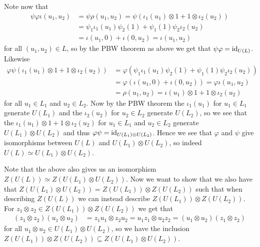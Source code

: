 Note now that
\begin{align*}
  \psi\varphi\iota(u_1,u_2) &= \psi\rho(u_1,u_2) = \psi(\iota_1(u_1)\otimes 1 + 1\otimes \iota_2(u_2)) \\
                              &= \psi_1\iota_1(u_1)\psi_2(1) + \psi_1(1)\psi_2\iota_2(u_2) \\
                            &= \iota(u_1,0) + \iota(0,u_2) = \iota(u_1,u_2)
\end{align*}
for all $(u_1,u_2)\in L$, so by the PBW theorem as above we get that $\psi\varphi=\operatorname{id}_{U(L)}$. Likewise
\begin{align*}
  \varphi\psi(\iota_1(u_1)\otimes 1 + 1\otimes \iota_2(u_2)) &= \varphi(\psi_1\iota_1(u_1)\psi_2(1) + \psi_1(1)\psi_2\iota_2(u_2)) \\
                                                             &= \varphi(\iota(u_1,0)+ \iota(0,u_2)) = \varphi\iota(u_1,u_2)\\
                                                             &= \rho(u_1,u_2) = \iota(u_1)\otimes 1 + 1\otimes \iota_2(u_2)
\end{align*}
for all $u_1\in L_1$ and $u_2\in L_2$. Now by the PBW theorem the $\iota_1(u_1)$ for $u_1\in L_1$ generate $U(L_1)$ and the $\iota_2(u_2)$ for $u_2\in L_2$ generate $U(L_2)$, so we see that the $\iota_1(u_1)\otimes 1+1\otimes\iota_2(u_2)$ for $u_1\in L_1$ and $u_2\in L_2$ generate $U(L_1)\otimes U(L_2)$ and thus $\varphi\psi=\operatorname{id}_{U(L_1)\otimes U(L_2)}$. Hence we see that $\varphi$ and $\psi$ give isomorphisms between $U(L)$ and $U(L_1)\otimes U(L_2)$, so indeed $U(L)\simeq U(L_1)\otimes U(L_2)$.

Note that the above also gives us an isomorphism $Z(U(L))\simeq Z(U(L_1)\otimes U(L_2))$. Now we want to show that we also have that $Z(U(L_1)\otimes U(L_2))= Z(U(L_1))\otimes Z(U(L_2))$ such that when describing $Z(U(L))$ we can instead describe $Z(U(L_1))\otimes Z(U(L_2))$. For $z_1\otimes z_2\in Z(U(L_1))\otimes Z(U(L_2))$ we get that
\begin{align*}
  (z_1\otimes z_2)(u_1\otimes u_2) &= z_1u_1\otimes z_2u_2 = u_1z_1\otimes u_2z_2 = (u_1\otimes u_2)(z_1\otimes z_2)
\end{align*}
for all $u_1\otimes u_2\in U(L_1)\otimes U(L_2)$, so we have the inclusion $Z(U(L_1))\otimes Z(U(L_2))\subseteq Z(U(L_1)\otimes U(L_2))$.

